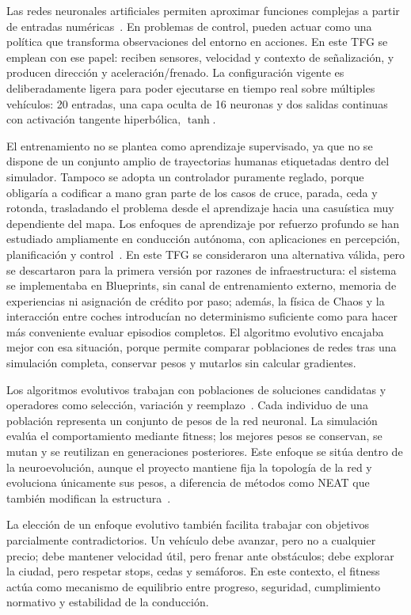 Las redes neuronales artificiales permiten aproximar funciones complejas a partir de entradas numéricas~\cite{cybenko}. En problemas de control, pueden actuar como una política que transforma observaciones del entorno en acciones. En este TFG se emplean con ese papel: reciben sensores, velocidad y contexto de señalización, y producen dirección y aceleración/frenado. La configuración vigente es deliberadamente ligera para poder ejecutarse en tiempo real sobre múltiples vehículos: 20 entradas, una capa oculta de 16 neuronas y dos salidas continuas con activación tangente hiperbólica, \(\tanh\).

El entrenamiento no se plantea como aprendizaje supervisado, ya que no se dispone de un conjunto amplio de trayectorias humanas etiquetadas dentro del simulador. Tampoco se adopta un controlador puramente reglado, porque obligaría a codificar a mano gran parte de los casos de cruce, parada, ceda y rotonda, trasladando el problema desde el aprendizaje hacia una casuística muy dependiente del mapa. Los enfoques de aprendizaje por refuerzo profundo se han estudiado ampliamente en conducción autónoma, con aplicaciones en percepción, planificación y control~\cite{kiran2022}. En este TFG se consideraron una alternativa válida, pero se descartaron para la primera versión por razones de infraestructura: el sistema se implementaba en Blueprints, sin canal de entrenamiento externo, memoria de experiencias ni asignación de crédito por paso; además, la física de Chaos y la interacción entre coches introducían no determinismo suficiente como para hacer más conveniente evaluar episodios completos. El algoritmo evolutivo encajaba mejor con esa situación, porque permite comparar poblaciones de redes tras una simulación completa, conservar pesos y mutarlos sin calcular gradientes.

Los algoritmos evolutivos trabajan con poblaciones de soluciones candidatas y operadores como selección, variación y reemplazo~\cite{eiben}. Cada individuo de una población representa un conjunto de pesos de la red neuronal. La simulación evalúa el comportamiento mediante fitness; los mejores pesos se conservan, se mutan y se reutilizan en generaciones posteriores. Este enfoque se sitúa dentro de la neuroevolución, aunque el proyecto mantiene fija la topología de la red y evoluciona únicamente sus pesos, a diferencia de métodos como NEAT que también modifican la estructura~\cite{stanley}.

La elección de un enfoque evolutivo también facilita trabajar con objetivos parcialmente contradictorios. Un vehículo debe avanzar, pero no a cualquier precio; debe mantener velocidad útil, pero frenar ante obstáculos; debe explorar la ciudad, pero respetar stops, cedas y semáforos. En este contexto, el fitness actúa como mecanismo de equilibrio entre progreso, seguridad, cumplimiento normativo y estabilidad de la conducción.

